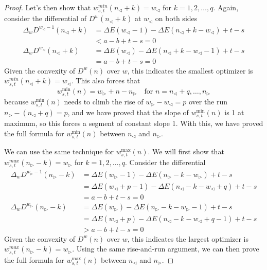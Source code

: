 \documentclass[]{article}
\begin{document}
\begin{proof}
	Let's then show that $w_{s,t}^{min}(n_{\triangleleft} + k) = w_{\triangleleft}$ for $k = 1,2,\dots,q$. Again, consider the differential of $D^w(n_{\triangleleft} + k)$ at $w_{\triangleleft}$ on both sides
	\begin{align*}
		\Delta_w D^{w_{\triangleleft} - 1}(n_{\triangleleft} + k) &= \Delta E(w_{\triangleleft} - 1) - \Delta E(n_{\triangleleft} + k - w_{\triangleleft}) + t - s\\
		&< a-b+t-s = 0\\
		\Delta_w D^{w_{\triangleleft}}(n_{\triangleleft} + k) &= \Delta E(w_{\triangleleft}) - \Delta E(n_{\triangleleft} + k - w_{\triangleleft} - 1) + t - s\\
		&= a -b +t-s = 0
	\end{align*}
	Given the convexity of $D^w(n)$ over $w$, this indicates the smallest optimizer is $w_{s,t}^{min}(n_{\triangleleft} + k) = w_{\triangleleft}$. This also forces that
	\[
	w^{\min}_{s,t}(n) = w_{\triangleright} + n - n_{\triangleright} \quad \text{for } n = n_{\triangleleft} + q,\dots,n_{\triangleright}
	\]
	because $w^{\min}_{s,t}(n)$ needs to climb the rise of $w_{\triangleright} - w_{\triangleleft} = p$ over the run $n_{\triangleright} - (n_{\triangleleft} + q) = p$, and we have proved that the slope of $w^{\min}_{s,t}(n)$ is 1 at maximum, so this forces a segment of constant slope 1. With this, we have proved the full formula for $w^{\min}_{s,t}(n)$ between $n_{\triangleleft}$ and $n_{\triangleright}$.

	We can use the same technique for $w^{\max}_{s,t}(n)$. We will first show that  $w_{s,t}^{max}(n_{\triangleright} - k) = w_{\triangleright}$ for $k = 1,2,\dots,q$. Consider the differential
	\begin{align*}
		\Delta_w D^{w_{\triangleright} - 1}(n_{\triangleright} - k) &= \Delta E(w_{\triangleright} - 1) - \Delta E(n_{\triangleright} - k - w_{\triangleright}) + t - s \\
		&=\Delta E(w_{\triangleleft} + p - 1) - \Delta E(n_{\triangleleft} - k - w_{\triangleleft} + q) + t - s\\
		&=a -b+t-s = 0\\
		\Delta_w D^{w_{\triangleright}}(n_{\triangleright} - k) &= \Delta E(w_{\triangleright}) - \Delta E(n_{\triangleright} - k - w_{\triangleright} - 1) + t - s \\
		&=\Delta E(w_{\triangleleft} + p) - \Delta E(n_{\triangleleft} - k - w_{\triangleleft} + q - 1) + t - s\\
		&>a -b +t-s = 0
	\end{align*}
	Given the convexity of $D^w(n)$ over $w$, this indicates the largest optimizer is $w_{s,t}^{max}(n_{\triangleright} - k) = w_{\triangleright}$. Using the same rise-and-run argument, we can then prove the full formula for  $w^{\max}_{s,t}(n)$ between $n_{\triangleleft}$ and $n_{\triangleright}$.


\end{proof}
\end{document}
